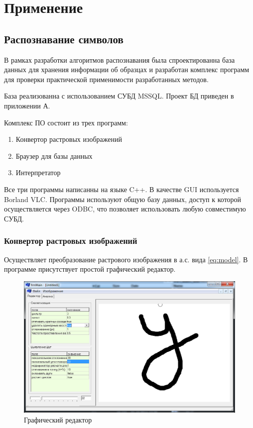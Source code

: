 \chapter{Применение} \label{chapt3}
\section{Распознавание символов}
В рамках разработки алгоритмов распознавания была спроектированна база данных для хранения информации об образцах и разработан комплекс программ для проверки практической применимости разработанных методов. 

База реализованна с использованием СУБД MSSQL. Проект БД приведен в приложении А.

Комплекс ПО состоит из трех программ:
\begin{enumerate}
\item Конвертор растровых изображений
\item Браузер для базы данных
\item Интерпретатор 
\end{enumerate}
Все три программы написанны на языке C++. В качестве GUI используется Borland VLC. Программы используют общую базу данных, доступ к которой осуществляется через ODBC, что позволяет использовать любую совместимую СУБД.

\subsection{Конвертор растровых изображений}
\noindent
Осуществляет преобразование растрового изображения в а.с. вида \ref{eq:model}. В программе присутствует простой графический редактор.

\begin{figure}[h]
	\centering
	\includegraphics[scale=0.25]{images/an_convertor_2}
	\caption{Графический редактор}
	\label{em_img_program}
\end{figure}

